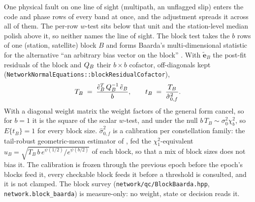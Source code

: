 \documentclass[main.tex]{subfiles}
\begin{document}
One physical fault on one line of sight (multipath, an unflagged slip)
enters the code and phase rows of every band at once, and the adjustment
spreads it across all of them.  The per-row $w$-test sits below that unit
and the station-level median polish above it, so neither names the line of
sight.  The block test takes the $b$ rows of one (station, satellite) block
$B$ and forms Baarda's multi-dimensional statistic for the alternative ``an
arbitrary bias vector on the block'' \cite{teunissen2000adjustment,snow2024laser}.  With
$\tilde{\bm e}_B$ the post-fit residuals of the block and $Q_B$ their
$b\times b$ cofactor, off-diagonals kept
(\texttt{NetworkNormalEquations::blockResidualCofactor}),
\begin{equation}
T_B \;=\; \frac{\tilde{e}_B^{T}\,Q_B^{-1}\,\tilde{e}_B}{b},
\qquad
t_B \;=\; \frac{T_B}{\hat\sigma^2_{0,f}} .
\label{eq:qc-block-T}
\end{equation}
With a diagonal weight matrix the weight factors of the general form cancel,
so for $b=1$ it is the square of the scalar $w$-test, and under the null
$b\,T_B \sim \sigma_0^2\chi^2_b$, so $E\{t_B\}=1$ for every block size.
$\hat\sigma^2_{0,f}$ is a calibration per constellation family: the
tail-robust geometric-mean estimator of , fed the
$\chi^2_1$-equivalent $u_B=\sqrt{T_B\,b\,e^{\psi(1/2)}/e^{\psi(b/2)}}$ of each
block, so that a mix of block sizes does not bias it.  The calibration is
frozen through the previous epoch before the epoch's blocks feed it, every
checkable block feeds it before a threshold is consulted, and it is not
clamped.  The block survey (\texttt{network/qc/BlockBaarda.hpp}, \texttt{network.block\_baarda}) is
measure-only: no weight, state or decision reads it.
\end{document}
